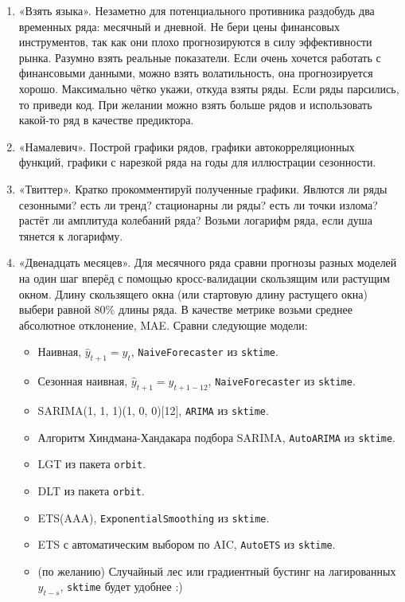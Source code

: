 \documentclass[12pt]{article}
\begin{document}
\begin{enumerate}
    \item «Взять языка». Незаметно для потенциального противника раздобудь два временных ряда: месячный и дневной. 
    Не бери цены финансовых инструментов, так как они плохо прогнозируются в силу эффективности рынка.
    Разумно взять реальные показатели. Если очень хочется работать с финансовыми данными, можно взять волатильность, 
    она прогнозируется хорошо. Максимально чётко укажи, откуда взяты ряды. Если ряды парсились, то приведи код. 
    При желании можно взять больше рядов и использовать какой-то ряд в качестве предиктора. 

    \item «Намалевич». Построй графики рядов, графики автокорреляционных функций, графики с нарезкой ряда на годы для иллюстрации сезонности. 
    
    \item «Твиттер». Кратко прокомментируй полученные графики. 
    Явлются ли ряды сезонными? есть ли тренд? стационарны ли ряды? есть ли точки излома? растёт ли амплитуда колебаний ряда?
    Возьми логарифм ряда, если душа тянется к логарифму.


    \item «Двенадцать месяцев». Для месячного ряда сравни прогнозы разных моделей на один шаг вперёд с помощью кросс-валидации скользящим или растущим окном. 
    Длину скользящего окна (или стартовую длину растущего окна) выбери равной 80\% длины ряда. В качестве метрике возьми среднее абсолютное отклонение, MAE. 
    Сравни следующие модели:

    \begin{itemize}
        \item Наивная, $\hat y_{t+1} = y_t$, \verb|NaiveForecaster| из \verb|sktime|.
        \item Сезонная наивная, $\hat y_{t+1} = y_{t + 1 - 12}$, \verb|NaiveForecaster| из \verb|sktime|.
        \item SARIMA(1, 1, 1)(1, 0, 0)[12], \verb|ARIMA| из \verb|sktime|.
        \item Алгоритм Хиндмана-Хандакара подбора SARIMA, \verb|AutoARIMA| из \verb|sktime|.
        \item LGT из пакета \verb|orbit|.
        \item DLT из пакета \verb|orbit|.
        \item ETS(AAA), \verb|ExponentialSmoothing| из \verb|sktime|.
        \item ETS с автоматическим выбором по AIC, \verb|AutoETS| из \verb|sktime|.
        \item (по желанию) Случайный лес или градиентный бустинг на лагированных $y_{t-s}$, \verb|sktime| будет удобнее :)
    \end{itemize}


\end{enumerate}
\end{document}
